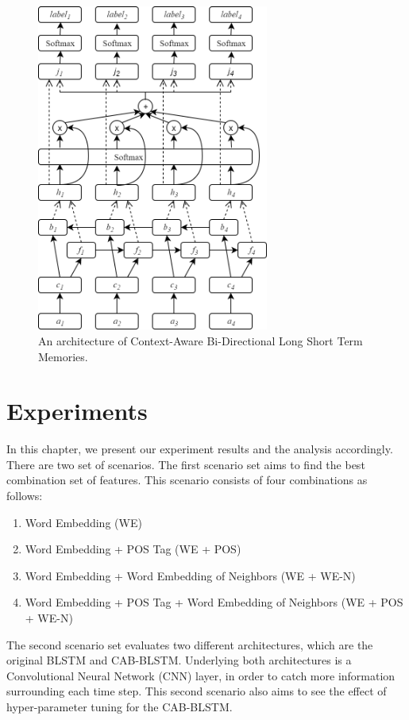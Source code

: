 \begin{figure}
	\includegraphics[width=3in]{cabilstm}
	\caption{An architecture of Context-Aware Bi-Directional Long Short Term Memories.}
	\label{fig:cabilstm}
\end{figure}

\section{Experiments}
In this chapter, we present our experiment results and the analysis accordingly. There are two set of scenarios. The first scenario set aims to find the best combination set of features. This scenario consists of four combinations as follows:

\begin{enumerate}
	\item Word Embedding (WE)
	\item Word Embedding + POS Tag (WE + POS)
	\item Word Embedding + Word Embedding of Neighbors (WE + WE-N)
	\item Word Embedding + POS Tag + Word Embedding of Neighbors (WE + POS + WE-N)
\end{enumerate}

The second scenario set evaluates two different architectures, which are the original BLSTM and CAB-BLSTM. Underlying both architectures is a Convolutional Neural Network (CNN) layer, in order to catch more information surrounding each time step. This second scenario also aims to see the effect of hyper-parameter tuning for the CAB-BLSTM.

